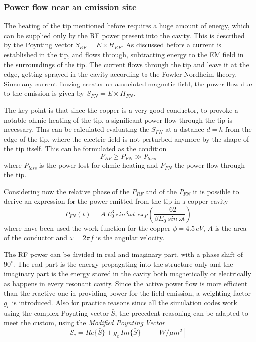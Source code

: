 \subsubsection{Power flow near an emission site}

The heating of the tip mentioned before requires a huge amount of energy, which can be supplied only by the RF power present into the cavity. This is described by the Poynting vector $S_{RF} = E\times H_{RF}$. As discussed before a current is established in the tip, and flows through, subtracting energy to the EM field in the surroundings of the tip. The current flows through the tip and leave it at the edge, getting sprayed in the cavity according to the Fowler-Nordheim theory. Since any current flowing creates an associated magnetic field, the power flow due to the emission is given by $S_{FN}=E\times H_{FN}$. 

The key point is that since the copper is a very good conductor, to provoke a notable ohmic heating of the tip, a significant power flow through the tip is necessary. This can be calculated evaluating the $S_{FN}$ at a distance $d=h$ from the edge of the tip, where the electric field is not perturbed anymore by the shape of the tip itself. This can be formulated as the condition 
\begin{equation}
P_{RF} \ge P_{FN} \gg P_{loss}
\end{equation}
where $P_{loss}$ is the power lost for ohmic heating and $P_{FN}$ the power flow through the tip.

Considering now the relative phase of the $P_{RF}$ and of the $P_{FN}$ it is possible to derive an expression for the power emitted from the tip in a copper cavity
\begin{equation}
P_{FN} (t) = A \, E^3_0 \, sin^3 \omega t \,  \, exp \left ( \frac{-62}{\beta E_0 \, sin \, \omega t} \right )
\end{equation}
where have been used the work function for the copper $\phi = 4.5 \, eV$, $A$ is the area of the conductor and $\omega = 2 \pi f$ is the angular velocity.

The RF power can be divided in real and imaginary part, with a phase shift of $90^\circ$. The real part is the energy propagating into the structure only and the imaginary part is the energy stored in the cavity both magnetically or electrically as happens in every resonant cavity. Since the active power flow is more efficient than the reactive one in providing power for the field emission, a weighting factor $g_c$ is introduced. Also for practice reasons since all the simulation codes work using the complex Poynting vector $\bar{S}$, the precedent reasoning can be adapted to meet the custom, using the \textit{Modified Poynting Vector}
\begin{equation}
S_c = Re\{ \bar{S} \} + g_c \, Im \{ \bar{S} \} \qquad [W/\mu m^2]
\end{equation} 

